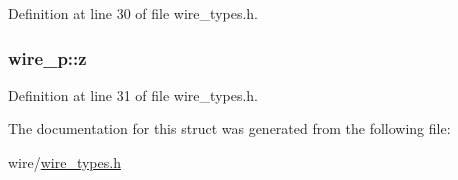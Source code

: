 Definition at line 30 of file wire\-\_\-types.\-h.

\hypertarget{structwire__p_a423cfb83825fc447478c866e4c2f6520}{
\subsubsection[{z}]{ wire\-\_\-p\-::z}}\label{structwire__p_a423cfb83825fc447478c866e4c2f6520}


Definition at line 31 of file wire\-\_\-types.\-h.



The documentation for this struct was generated from the following file\-:\begin{DoxyCompactItemize}
\item 
wire/\hyperlink{wire__types_8h}{wire\-\_\-types.\-h}\end{DoxyCompactItemize}
